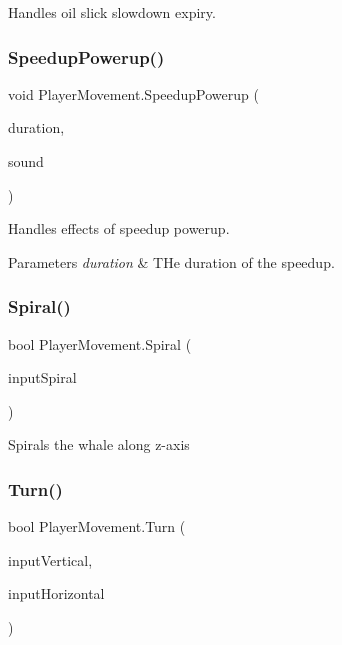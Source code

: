 Handles oil slick slowdown expiry. 

\mbox{\label{class_player_movement_a9d75c39b5e4ee0c5d999bdfdc4d1db73}} 
\subsubsection{\texorpdfstring{Speedup\+Powerup()}{SpeedupPowerup()}}
{\footnotesize\ttfamily void Player\+Movement.\+Speedup\+Powerup (\begin{DoxyParamCaption}\item[{float}]{duration,  }\item[{Audio\+Clip}]{sound }\end{DoxyParamCaption})}



Handles effects of speedup powerup. 
\begin{DoxyParams}{Parameters}
{\em duration} & T\+He duration of the speedup.\\
\hline
\end{DoxyParams}


\mbox{\label{class_player_movement_a02c0e10fc29c38c92c6196d70364ac89}} 
\subsubsection{\texorpdfstring{Spiral()}{Spiral()}}
{\footnotesize\ttfamily bool Player\+Movement.\+Spiral (\begin{DoxyParamCaption}\item[{float}]{input\+Spiral }\end{DoxyParamCaption})}



Spirals the whale along z-\/axis 

\mbox{\label{class_player_movement_a32c7ec914f2b18dfcf6e9c354f6e2f8e}} 
\subsubsection{\texorpdfstring{Turn()}{Turn()}}
{\footnotesize\ttfamily bool Player\+Movement.\+Turn (\begin{DoxyParamCaption}\item[{float}]{input\+Vertical,  }\item[{float}]{input\+Horizontal }\end{DoxyParamCaption})}



